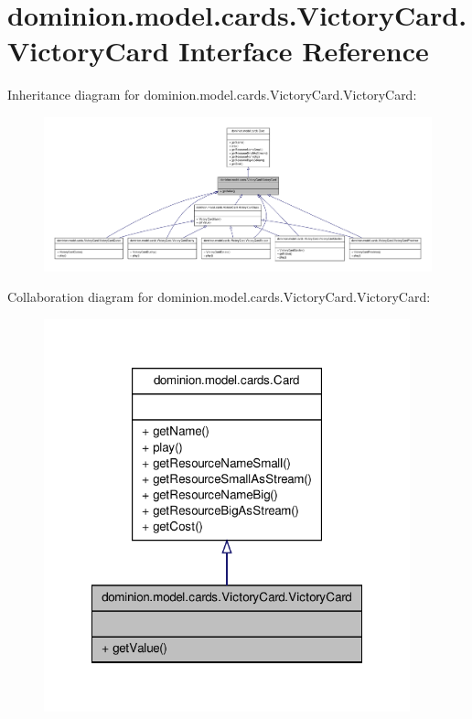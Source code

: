 \hypertarget{interfacedominion_1_1model_1_1cards_1_1VictoryCard_1_1VictoryCard}{\section{dominion.\-model.\-cards.\-Victory\-Card.\-Victory\-Card \-Interface \-Reference}
\label{interfacedominion_1_1model_1_1cards_1_1VictoryCard_1_1VictoryCard}
}


\-Inheritance diagram for dominion.\-model.\-cards.\-Victory\-Card.\-Victory\-Card\-:
\nopagebreak
\begin{figure}[H]
\begin{center}
\leavevmode
\includegraphics[width=350pt]{interfacedominion_1_1model_1_1cards_1_1VictoryCard_1_1VictoryCard__inherit__graph}
\end{center}
\end{figure}


\-Collaboration diagram for dominion.\-model.\-cards.\-Victory\-Card.\-Victory\-Card\-:
\nopagebreak
\begin{figure}[H]
\begin{center}
\leavevmode
\includegraphics[width=300pt]{interfacedominion_1_1model_1_1cards_1_1VictoryCard_1_1VictoryCard__coll__graph}
\end{center}
\end{figure}
